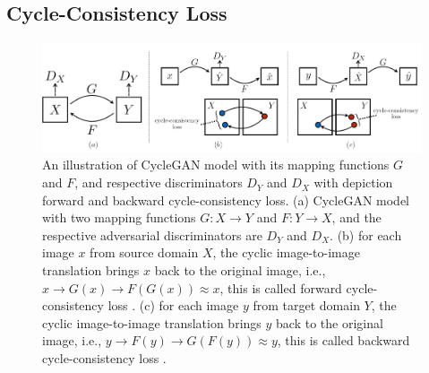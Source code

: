 


\subsection{Cycle-Consistency Loss}\label{CycleConsistencyLoss}

\begin{figure}[H]
	    \begin{center} \includegraphics[scale=0.5]{images/Methodology/CycleGAN.jpg}
	    \caption[An illustration of \ac{CycleGAN} model with its mapping functions $G$ and $F$, and respective discriminators $D_Y$ and $D_X$ with depiction forward and backward cycle-consistency loss.]{An illustration of \ac{CycleGAN} model with its mapping functions $G$ and $F$, and respective discriminators $D_Y$ and $D_X$ with depiction forward and backward cycle-consistency loss. (a) \ac{CycleGAN} model with two mapping functions $G : X \rightarrow Y$ and $F : Y \rightarrow X$, and the respective adversarial discriminators are $D_Y$ and $D_X$. (b) for each image $x$ from source domain $X$, the cyclic image-to-image translation brings $x$ back to the original image, i.e., $x \rightarrow G(x) \rightarrow F(G(x)) \approx x$, this is called forward cycle-consistency loss \cite{zhu2020unpaired}. (c) for each image $y$ from target domain $Y$, the cyclic image-to-image translation brings $y$ back to the original image, i.e., $y \rightarrow F(y) \rightarrow G(F(y)) \approx y$, this is called backward cycle-consistency loss \cite{zhu2020unpaired}.}
	    \label{fig:CycleGAN}
	    \end{center}
\end{figure}


